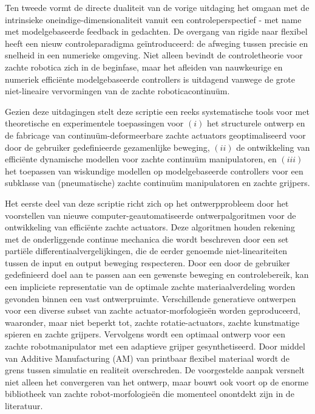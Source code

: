Ten tweede vormt de directe dualiteit van de vorige uitdaging het omgaan met de intrinsieke oneindige-dimensionaliteit vanuit een controleperspectief - met name met modelgebaseerde feedback in gedachten. De overgang van rigide naar flexibel heeft een nieuw controleparadigma geïntroduceerd: de afweging tussen precisie en snelheid in een numerieke omgeving. Niet alleen bevindt de controletheorie voor zachte robotica zich in de beginfase, maar het afleiden van nauwkeurige en numeriek efficiënte modelgebaseerde controllers is uitdagend vanwege de grote niet-lineaire vervormingen van de zachte roboticacontinuüm.

Gezien deze uitdagingen stelt deze scriptie een reeks systematische tools voor met theoretische en experimentele toepassingen voor $(i)$ het structurele ontwerp en de fabricage van continuüm-deformeerbare zachte actuators geoptimaliseerd voor door de gebruiker gedefinieerde gezamenlijke beweging, $(ii)$ de ontwikkeling van efficiënte dynamische modellen voor zachte continuüm manipulatoren, en $(iii)$ het toepassen van wiskundige modellen op modelgebaseerde controllers voor een subklasse van (pneumatische) zachte continuüm manipulatoren en zachte grijpers.

Het eerste deel van deze scriptie richt zich op het ontwerpprobleem door het voorstellen van nieuwe computer-geautomatiseerde ontwerpalgoritmen voor de ontwikkeling van efficiënte zachte actuators. Deze algoritmen houden rekening met de onderliggende continue mechanica die wordt beschreven door een set partiële differentiaalvergelijkingen, die de eerder genoemde niet-lineariteiten tussen de input en output beweging respecteren. Door een door de gebruiker gedefinieerd doel aan te passen aan een gewenste beweging en controlebereik, kan een impliciete representatie van de optimale zachte materiaalverdeling worden gevonden binnen een vast ontwerpruimte. Verschillende generatieve ontwerpen voor een diverse subset van zachte actuator-morfologieën worden geproduceerd, waaronder, maar niet beperkt tot, zachte rotatie-actuators, zachte kunstmatige spieren en zachte grijpers. Vervolgens wordt een optimaal ontwerp voor een zachte robotmanipulator met een adaptieve grijper gesynthetiseerd. Door middel van Additive Manufacturing (AM) van printbaar flexibel materiaal wordt de grens tussen simulatie en realiteit overschreden. De voorgestelde aanpak versnelt niet alleen het convergeren van het ontwerp, maar bouwt ook voort op de enorme bibliotheek van zachte robot-morfologieën die momenteel onontdekt zijn in de literatuur.

